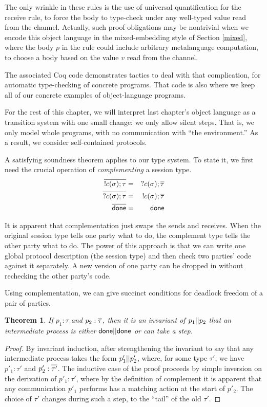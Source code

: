\documentclass{amsbook}
\newtheorem{theorem}{Theorem}[chapter]
\theoremstyle{definition}
\theoremstyle{remark}
\numberwithin{section}{chapter}
\numberwithin{equation}{chapter}
\begin{document}
The only wrinkle in these rules is the use of universal quantification for the receive rule, to force the body to type-check under any well-typed value read from the channel.
Actually, such proof obligations may be nontrivial when we encode this object language in the mixed-embedding style of Section \ref{mixed}, where the body $p$ in the rule could include arbitrary metalanguage computation, to choose a body based on the value $v$ read from the channel.

The associated Coq code demonstrates tactics to deal with that complication, for automatic type-checking of concrete programs.
That code is also where we keep all of our concrete examples of object-language programs.

For the rest of this chapter, we will interpret last chapter's object language as a transition system with one small change: we only allow silent steps.
That is, we only model whole programs, with no communication with ``the environment.''
As a result, we consider self-contained protocols.

A satisfying soundness theorem applies to our type system.  To state it, we first need the crucial operation of \emph{complementing} a session type.
\begin{eqnarray*}
  \overline{!c(\sigma); \tau} &=& ?c(\sigma); \overline{\tau} \\
  \overline{?c(\sigma); \tau} &=& !c(\sigma); \overline{\tau} \\
  \overline{\mathsf{done}} &=& \mathsf{done}
\end{eqnarray*}

\modularity
It is apparent that complementation just swaps the sends and receives.
When the original session type tells one party what to do, the complement type tells the other party what to do.
The power of this approach is that we can write one global protocol description (the session type) and then check two parties' code against it separately.
A new version of one party can be dropped in without rechecking the other party's code.

Using complementation, we can give succinct conditions for deadlock freedom of a pair of parties.

\begin{theorem}\label{stsound1}
  If $p_1 : \tau$ and $p_2 : \overline{\tau}$, then it is an invariant of $p_1 || p_2$ that an intermediate process is either $\mathsf{done} || \mathsf{done}$ or can take a step.
\end{theorem}
\begin{proof}
  By invariant induction, after strengthening the invariant to say that any intermediate process takes the form $p'_1 || p'_2$, where, for some type $\tau'$, we have $p'_1 : \tau'$ and $p'_2 : \overline{\tau'}$.
  The inductive case of the proof proceeds by simple inversion on the derivation of $p'_1 : \tau'$, where by the definition of complement it is apparent that any communication $p'_1$ performs has a matching action at the start of $p'_2$.
  The choice of $\tau'$ changes during such a step, to the ``tail'' of the old $\tau'$.
\end{proof}
\end{document}
